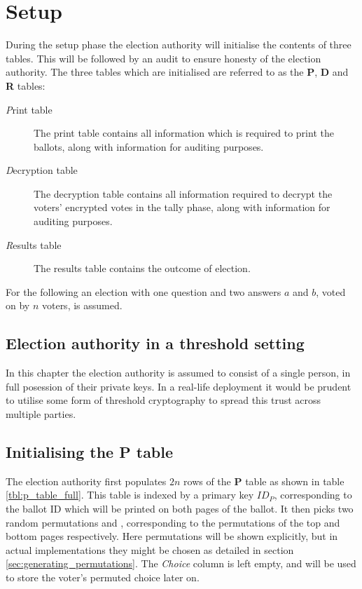 \chapter{Setup}
\label{ch:setup}

During the setup phase the election authority will initialise the contents of
three tables. This will be followed by an audit to ensure honesty of the
election authority. The three tables which are initialised are referred to as
the \textbf{P}, \textbf{D} and \textbf{R} tables:
\begin{description}
\item[\emph{P}rint table] The print table contains all information which is
	required to print the ballots, along with information for auditing
		purposes.
\item[\emph{D}ecryption table] The decryption table contains all information
	required to decrypt the voters' encrypted votes in the tally phase,
		along with information for auditing purposes.
\item[\emph{R}esults table] The results table contains the outcome of election.
\end{description}

For the following an election with one question and two answers $a$ and $b$,
voted on by $n$ voters, is assumed.

\section{Election authority in a threshold setting}

In this chapter the election authority is assumed to consist of a single
person, in full posession of their private keys. In a real-life deployment it
would be prudent to utilise some form of threshold cryptography to spread this
trust across multiple parties.

\section{Initialising the \textbf{P} table}

The election authority first populates $2n$ rows of the \textbf{P} table as
shown in table \ref{tbl:p_table_full}. This table is indexed by a primary key
$ID_P$, corresponding to the ballot ID which will be printed on both pages of
the ballot. It then picks two random permutations \ptop{} and \pbottom{},
corresponding to the permutations of the top and bottom pages respectively.
Here permutations will be shown explicitly, but in actual implementations they
might be chosen as detailed in section \ref{sec:generating_permutations}. The
\emph{Choice} column is left empty, and will be used to store the voter's
permuted choice later on.

